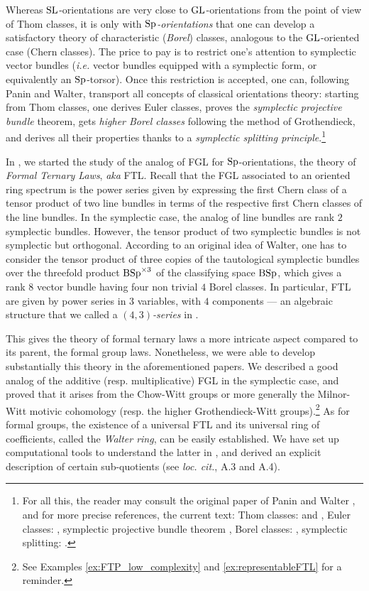 \documentclass[11pt,leqno]{amsart}
\theoremstyle{remark}
\theoremstyle{definition}
\numberwithin{equation}{thm}
\begin{document}
\bigskip

Whereas $\mathrm{SL}$-orientations are very close to $\mathrm{GL}$-orientations from the point of view of Thom classes,
 it is only with \emph{$\mathrm{Sp}$-orientations} that one can develop a satisfactory theory of characteristic
 (\emph{Borel}) classes, analogous to the $\mathrm{GL}$-oriented case (Chern classes).
 The price to pay is to restrict one's attention to symplectic vector bundles
 (\emph{i.e.} vector bundles equipped with a symplectic form, or equivalently an $\mathrm{Sp}$-torsor).
Once this restriction is accepted, one can, following Panin and Walter, transport
 all concepts of classical orientations theory:
 starting from Thom classes, one derives Euler classes, proves the \emph{symplectic projective bundle} theorem,
 gets \emph{higher Borel classes} following the method of Grothendieck, and derives all their properties
 thanks to a \emph{symplectic splitting principle}.\footnote{For all this,
 the reader may consult the original paper of Panin and Walter \cite{PW_MSP},
 and for more precise references, the current text: Thom classes:  and ,
 Euler classes: , symplectic projective bundle theorem ,
 Borel classes: , symplectic splitting: .}
  

In \cite{DF3, DFJK}, we started the study of the analog of FGL for $\mathrm{Sp}$-orientations,
 the theory of \emph{Formal Ternary Laws}, \emph{aka} FTL. Recall that the FGL associated
 to an oriented ring spectrum is the power series given by expressing the first Chern class of a tensor product of two line
 bundles in terms of the respective first Chern classes of the line bundles.
 In the symplectic case, the analog of line bundles are rank $2$ symplectic bundles.
 However, the tensor product of two symplectic bundles is not symplectic but orthogonal.
 According to an original idea of Walter, one has to consider the tensor product of three copies
 of the tautological symplectic bundles over the threefold product $\mathrm{BSp}^{\times 3}$ of the classifying space $\mathrm{BSp}$, which gives a rank $8$ vector bundle having
four non trivial $4$ Borel classes. In particular, FTL are given by power series in $3$ variables,
 with $4$ components --- an algebraic structure that we called a \emph{$(4,3)$-series} in \cite{CDFH}.

This gives the theory of formal ternary laws a more intricate aspect compared to its parent,
 the formal group laws.
 Nonetheless, we were able to develop substantially this theory in the aforementioned papers.
 We described a good analog of the additive (resp. multiplicative) FGL in the symplectic case,
 and proved that it arises from the Chow-Witt groups or more generally the Milnor-Witt motivic cohomology
 (resp. the higher Grothendieck-Witt groups).\footnote{See Examples \ref{ex:FTP_low_complexity}
 and \ref{ex:representableFTL} for a reminder.}
 As for formal groups, the existence of a universal FTL and its universal ring of coefficients,
 called the \emph{Walter ring}, can be easily established.
 We have set up computational tools to understand the latter in \cite{DFJK}, and derived
 an explicit description of certain sub-quotients (see \emph{loc. cit.}, A.3 and A.4).
 
\end{document}
